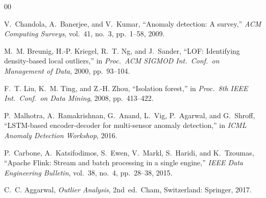 \documentclass[12pt,a4paper,oneside]{report}
\begin{document}
\begin{thebibliography}{00}

V.~Chandola, A.~Banerjee, and V.~Kumar, ``Anomaly detection: A survey,''
\emph{ACM Computing Surveys}, vol.~41, no.~3, pp.~1--58, 2009.

M.~M. Breunig, H.-P. Kriegel, R.~T. Ng, and J.~Sander, ``LOF: Identifying
density-based local outliers,'' in \emph{Proc.\ ACM SIGMOD Int.\ Conf.\ on
Management of Data}, 2000, pp.~93--104.

F.~T. Liu, K.~M. Ting, and Z.-H. Zhou, ``Isolation forest,'' in \emph{Proc.\
8th IEEE Int.\ Conf.\ on Data Mining}, 2008, pp.~413--422.

P.~Malhotra, A.~Ramakrishnan, G.~Anand, L.~Vig, P.~Agarwal, and G.~Shroff,
``LSTM-based encoder-decoder for multi-sensor anomaly detection,'' in
\emph{ICML Anomaly Detection Workshop}, 2016.

P.~Carbone, A.~Katsifodimos, S.~Ewen, V.~Markl, S.~Haridi, and K.~Tzoumas,
``Apache Flink: Stream and batch processing in a single engine,''
\emph{IEEE Data Engineering Bulletin}, vol.~38, no.~4, pp.~28--38, 2015.

C.~C. Aggarwal, \emph{Outlier Analysis}, 2nd~ed.\ Cham, Switzerland:
Springer, 2017.

\end{thebibliography}
\end{document}
